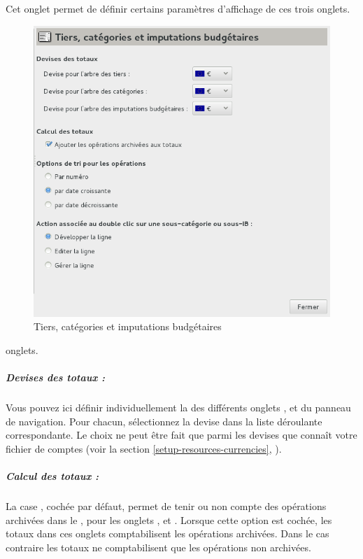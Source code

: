 Cet onglet permet de définir certains paramètres d'affichage de ces trois \ifIllustration onglets.
\begin{figure}[h!]
\begin{center}
\includegraphics[scale=0.5]{image/screenshot/setup_thirdCategories}
\end{center}
\caption{Tiers, catégories et imputations budgétaires}
\label{setup-thirdCategories-img}
\end{figure}
\else onglets.
\fi


\subparagraph{Devises des totaux :\label{setup-display-third-currencies}}

Vous pouvez ici définir individuellement la  des différents onglets ,  et  du panneau de navigation. Pour chacun, sélectionnez la devise dans la liste déroulante correspondante. Le choix ne peut être fait que parmi les devises que connaît votre fichier de comptes (voir la section \vref{setup-resources-currencies}, ).


\subparagraph{Calcul des totaux :\label{setup-display-third-sum}}

La case , cochée par défaut, permet de tenir ou non compte des opérations archivées dans le , pour les onglets ,  et . Lorsque cette option est cochée, les totaux dans ces onglets comptabilisent les opérations archivées. Dans le cas contraire les totaux ne comptabilisent que les opérations non archivées.

